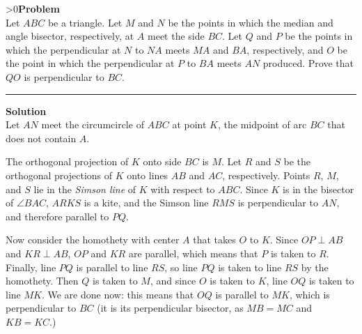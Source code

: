 \documentclass[12pt,oneside,a4paper]{book}
\newcounter{probnum}
\newcounter{solnum}
\newcommand{\prob}{\ifnum\value{probnum}>0\newpage\fi\setcounter{solnum}{0}\stepcounter{probnum}\textbf{Problem \theprobnum}\\}
\newcommand{\soln}{\stepcounter{solnum}\medskip\hrule\medbreak\textbf{Solution \thesolnum}\\}
\begin{document}
\prob Let $ABC$ be a triangle. Let $M$ and $N$ be the points in which the median and angle bisector, respectively, at $A$ meet the side $BC$. Let $Q$ and $P$ be the points in which the perpendicular at $N$ to $NA$ meets $MA$ and $BA$, respectively, and $O$ be the point in which the perpendicular at $P$ to $BA$ meets $AN$ produced. Prove that $QO$ is perpendicular to $BC$.

\soln
Let $AN$ meet the circumcircle of $ABC$ at point $K$, the midpoint of arc $BC$ that does not contain $A$.
\begin{center}
\end{center}

The orthogonal projection of $K$ onto side $BC$ is $M$. Let $R$ and $S$ be the orthogonal projections of $K$ onto lines $AB$ and $AC$, respectively. Points $R$, $M$, and $S$ lie in the \emph{Simson line} of $K$ with respect to $ABC$. Since $K$ is in the bisector of $\angle BAC$, $ARKS$ is a kite, and the Simson line $RMS$ is perpendicular to $AN$, and therefore parallel to $PQ$.

Now consider the homothety with center $A$ that takes $O$ to $K$. Since $OP\perp AB$ and $KR\perp AB$, $OP$ and $KR$ are parallel, which means that $P$ is taken to $R$. Finally, line $PQ$ is parallel to line $RS$, so line $PQ$ is taken to line $RS$ by the homothety. Then $Q$ is taken to $M$, and since $O$ is taken to $K$, line $OQ$ is taken to line $MK$. We are done now: this means that $OQ$ is parallel to $MK$, which is perpendicular to $BC$ (it is its perpendicular bisector, as $MB=MC$ and $KB=KC$.)
\end{document}
